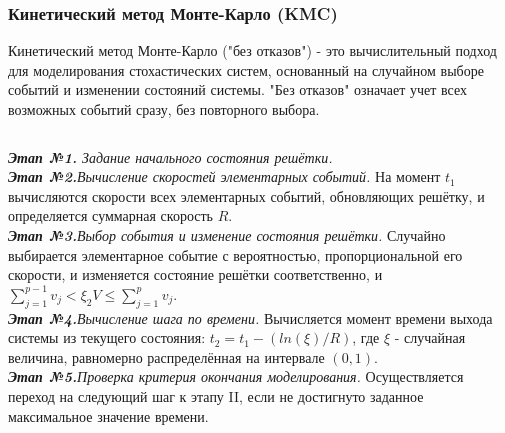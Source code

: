 \documentclass[
    11pt, %
    aspectratio=169, %
]{beamer}
\begin{document}
\logo{}
\begin{frame}
    \frametitle{Кинетический метод Монте-Карло (KMC)}
		
    \fontsize{8}{10}\selectfont{}

    \vspace{-0.2cm}

    \begin{block}{\fontsize{8}{10}\selectfont{Прямой метод КМС (aлгоритм “без отказов”, алгоритм Гиллеспи для решёточной модели)}}
        Кинетический метод Монте-Карло ("без отказов") - это вычислительный подход для моделирования стохастических систем, основанный на случайном выборе событий и изменении состояний системы. "Без отказов" означает учет всех возможных событий сразу, без повторного выбора.
    \end{block}

    \begin{columns}[t] %
        \begin{column}{0.75\textwidth}
                \textit{\textbf{Этап №1.} Задание начального состояния решётки.} \\
                \textit{\textbf{Этап №2.}Вычисление скоростей элементарных событий.} На момент $t_1$ вычисляются скорости всех элементарных событий, обновляющих решётку, и определяется суммарная скорость $R$. \\
                \textit{\textbf{Этап №3.}Выбор события и изменение состояния решётки.} Случайно выбирается элементарное событие с вероятностью, пропорциональной его скорости, и изменяется состояние решётки соответственно, и $\sum_{j=1}^{p-1} v_{j}<\xi_{2} V \leq \sum_{j=1}^{p} v_{j}$.\\
                \textit{\textbf{Этап №4.}Вычисление шага по времени. } Вычисляется момент времени   выхода системы из текущего состояния: $t_2 = t_1 - (ln(\xi) / R)$, где  $\xi$  - случайная величина, равномерно распределённая на интервале $(0, 1)$. \\
                \textit{\textbf{Этап №5.}Проверка критерия окончания моделирования.} Осуществляется переход на следующий шаг к этапу II, если не достигнуто заданное максимальное значение времени. \\
        \end{column}


\end{columns}
\end{frame}
\end{document}
